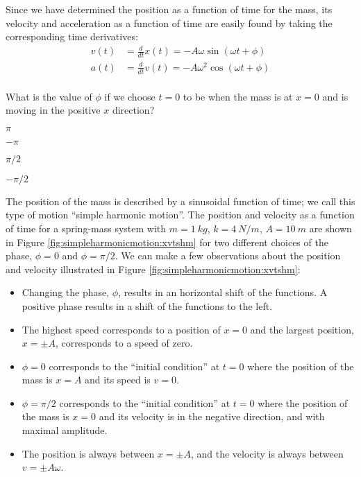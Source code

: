 Since we have determined the position as a function of time for the mass, its velocity and acceleration as a function of time are easily found by taking the corresponding time derivatives:
\begin{align*}
v(t) &= \frac{d}{dt}x(t) = -A\omega\sin(\omega t + \phi)\\
a(t)&= \frac{d}{dt}v(t) = -A\omega^2\cos(\omega t + \phi)\\
\end{align*}

\begin{checkpoint}
\begin{MCquestion}{What is the value of $\phi$ if we choose $t=0$ to be when the mass is at $x=0$ and is moving in the positive $x$ direction?}
\item $\pi$
\item $-\pi$
\item $\pi/2$
\item $-\pi/2$ \correct
\end{MCquestion}
\end{checkpoint}

The position of the mass is described by a sinusoidal function of time; we call this type of motion ``simple harmonic motion''. The position and velocity as a function of time for a spring-mass system with $m=\SI{1}{kg}$, $k=\SI{4}{N/m}$, $A=\SI{10}{m}$ are shown in Figure \ref{fig:simpleharmonicmotion:xvtshm} for two different choices of the phase, $\phi=0$ and $\phi=\pi/2$.
We can make a few observations about the position and velocity illustrated in Figure \ref{fig:simpleharmonicmotion:xvtshm}:
\begin{itemize}
\item Changing the phase, $\phi$, results in an horizontal shift of the functions. A positive phase results in a shift of the functions to the left.
\item The highest speed corresponds to a position of $x=0$ and the largest position, $x=\pm A$, corresponds to a speed of zero.
\item $\phi = 0$ corresponds to the ``initial condition'' at $t=0$ where the position of the mass is $x=A$ and its speed is $v=0$.
\item $\phi = \pi/2$ corresponds to the ``initial condition'' at $t=0$ where the position of the mass is $x=0$ and its velocity is in the negative direction, and with maximal amplitude.
\item The position is always between $x=\pm A$, and the velocity is always between $v=\pm A\omega$.
\end{itemize}

